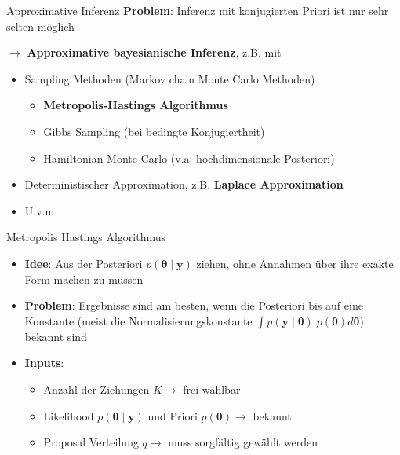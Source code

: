 \documentclass[
  ignorenonframetext,
  aspectratio=169,
]{beamer}
\providecommand{\tightlist}{%
  \setlength{\itemsep}{0pt}\setlength{\parskip}{0pt}}
\newcommand{\by}{\bm{y}}
\newcommand{\btheta}{\bm{\theta}}
\begin{document}
\begin{frame}{Approximative Inferenz}
\protect{}\label{approximative-inferenz}
\textbf{Problem}: Inferenz mit konjugierten Priori ist nur sehr selten
möglich \autocite{polson_bayesian_2013}

\(\to\) \textbf{Approximative bayesianische Inferenz}, z.B. mit

\begin{itemize}
\tightlist
\item
  Sampling Methoden (Markov chain Monte Carlo Methoden)

  \begin{itemize}
  \tightlist
  \item
    \textbf{Metropolis-Hastings Algorithmus}
    \autocite{hastings_monte_1970}
  \item
    Gibbs Sampling (bei bedingte Konjugiertheit)
    \autocite{dellaportas_bayesian_1993}
  \item
    Hamiltonian Monte Carlo (v.a. hochdimensionale Posteriori)
    \autocite{neal_probabilistic_1993}
  \end{itemize}
\item
  Deterministischer Approximation, z.B. \textbf{Laplace Approximation}
  \autocite{tierney_accurate_1986}
\item
  U.v.m.
\end{itemize}
\end{frame}

\begin{frame}{Metropolis Hastings Algorithmus
\autocite{hastings_monte_1970}}
\protect{}\label{metropolis-hastings-algorithmus-hastings_monte_1970}
\begin{itemize}
\item
  \textbf{Idee}: Aus der Posteriori \(p(\btheta\mid \by)\) ziehen, ohne
  Annahmen über ihre exakte Form machen zu müssen
\item
  \textbf{Problem}: Ergebnisse sind am besten, wenn die Posteriori bis
  auf eine Konstante (meist die Normalisierungskonstante
  \(\int p(\by \mid \btheta) \; p(\btheta) d \btheta\)) bekannt sind
\item
  \textbf{Inputs}:

  \begin{itemize}
  \tightlist
  \item
    Anzahl der Ziehungen \(K \to\) frei wählbar
  \item
    Likelihood \(p(\btheta \mid \by)\) und Priori \(p(\btheta) \to\)
    bekannt
  \item
    Proposal Verteilung \(q \to\) muss sorgfältig gewählt werden
  \end{itemize}
\end{itemize}
\end{frame}
\end{document}
